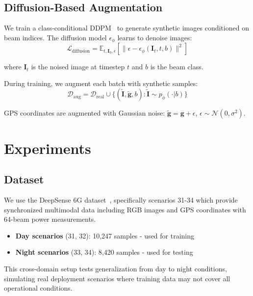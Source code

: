 \documentclass[conference]{IEEEtran}
\begin{document}
\subsection{Diffusion-Based Augmentation}

We train a class-conditional DDPM~\cite{ddpm2020} to generate synthetic images conditioned on beam indices. The diffusion model $\epsilon_\phi$ learns to denoise images:
\begin{equation}
    \mathcal{L}_\text{diffusion} = \mathbb{E}_{t, \mathbf{I}_0, \epsilon}[\|\epsilon - \epsilon_\phi(\mathbf{I}_t, t, b)\|^2]
\end{equation}

where $\mathbf{I}_t$ is the noised image at timestep $t$ and $b$ is the beam class.

During training, we augment each batch with synthetic samples:
\begin{equation}
    \mathcal{D}_\text{aug} = \mathcal{D}_\text{real} \cup \{(\tilde{\mathbf{I}}, \tilde{\mathbf{g}}, b) : \tilde{\mathbf{I}} \sim p_\phi(\cdot|b)\}
\end{equation}

GPS coordinates are augmented with Gaussian noise: $\tilde{\mathbf{g}} = \mathbf{g} + \epsilon$, $\epsilon \sim \mathcal{N}(0, \sigma^2)$.

\section{Experiments}

\subsection{Dataset}

We use the DeepSense 6G dataset~\cite{deepsense2023}, specifically scenarios 31-34 which provide synchronized multimodal data including RGB images and GPS coordinates with 64-beam power measurements.

\begin{itemize}
    \item \textbf{Day scenarios} (31, 32): 10,247 samples - used for training
    \item \textbf{Night scenarios} (33, 34): 8,420 samples - used for testing
\end{itemize}

This cross-domain setup tests generalization from day to night conditions, simulating real deployment scenarios where training data may not cover all operational conditions.
\end{document}
